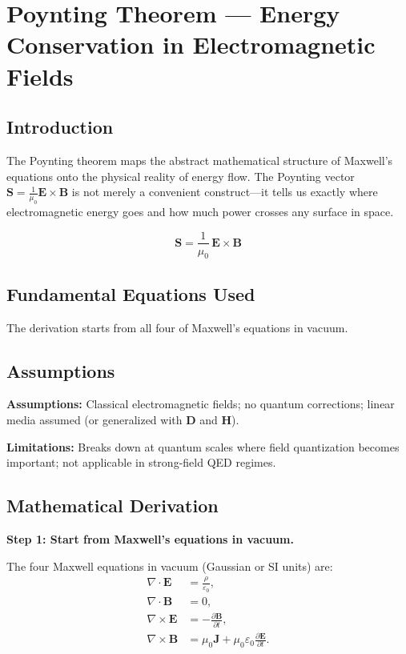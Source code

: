 \chapter{Poynting Theorem — Energy Conservation in Electromagnetic Fields}

\section*{Introduction}

The Poynting theorem maps the abstract mathematical structure of Maxwell's equations onto the physical reality of energy flow. The Poynting vector $\mathbf{S} = \frac{1}{\mu_0}\mathbf{E} \times \mathbf{B}$ is not merely a convenient construct---it tells us exactly where electromagnetic energy goes and how much power crosses any surface in space.


\begin{equation}
\mathbf{S} = \frac{1}{\mu_0}\,\mathbf{E} \times \mathbf{B}
\end{equation}

\section*{Fundamental Equations Used}

The derivation starts from all four of Maxwell's equations in vacuum.

\section*{Assumptions}

\textbf{Assumptions:} Classical electromagnetic fields; no quantum corrections; linear media assumed (or generalized with $\mathbf{D}$ and $\mathbf{H}$).


\textbf{Limitations:} Breaks down at quantum scales where field quantization becomes important; not applicable in strong-field QED regimes.


\section*{Mathematical Derivation}

\textbf{Step 1: Start from Maxwell's equations in vacuum.}

The four Maxwell equations in vacuum (Gaussian or SI units) are:
\begin{align}
\nabla\cdot\mathbf{E} &= \frac{\rho}{\varepsilon_0}, \\
\nabla\cdot\mathbf{B} &= 0, \\
\nabla\times\mathbf{E} &= -\frac{\partial\mathbf{B}}{\partial t}, \\
\nabla\times\mathbf{B} &= \mu_0\mathbf{J} + \mu_0\varepsilon_0\frac{\partial\mathbf{E}}{\partial t}.
\end{align}

